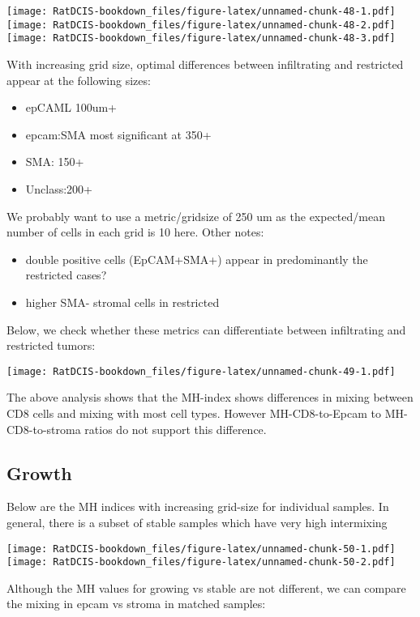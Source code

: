 \documentclass[
]{book}
\providecommand{\tightlist}{%
  \setlength{\itemsep}{0pt}\setlength{\parskip}{0pt}}
\begin{document}
\texttt{[image: RatDCIS-bookdown\_files/figure-latex/unnamed-chunk-48-1.pdf]} \texttt{[image: RatDCIS-bookdown\_files/figure-latex/unnamed-chunk-48-2.pdf]} \texttt{[image: RatDCIS-bookdown\_files/figure-latex/unnamed-chunk-48-3.pdf]}

With increasing grid size, optimal differences between infiltrating and restricted appear at the following sizes:

\begin{itemize}
\tightlist
\item
  epCAML 100um+
\item
  epcam:SMA most significant at 350+
\item
  SMA: 150+
\item
  Unclass:200+
\end{itemize}

We probably want to use a metric/gridsize of 250 um as the expected/mean number of cells in each grid is 10 here.
Other notes:

\begin{itemize}
\tightlist
\item
  double positive cells (EpCAM+SMA+) appear in predominantly the restricted cases?
\item
  higher SMA- stromal cells in restricted
\end{itemize}

Below, we check whether these metrics can differentiate between infiltrating and restricted tumors:

\texttt{[image: RatDCIS-bookdown\_files/figure-latex/unnamed-chunk-49-1.pdf]}

The above analysis shows that the MH-index shows differences in mixing between CD8 cells and mixing with most cell types. However MH-CD8-to-Epcam to MH-CD8-to-stroma ratios do not support this difference.

\hypertarget{growth-2}{%
\subsection{Growth}\label{growth-2}}

Below are the MH indices with increasing grid-size for individual samples. In general, there is a subset of stable samples which have very high intermixing

\texttt{[image: RatDCIS-bookdown\_files/figure-latex/unnamed-chunk-50-1.pdf]} \texttt{[image: RatDCIS-bookdown\_files/figure-latex/unnamed-chunk-50-2.pdf]}

Although the MH values for growing vs stable are not different, we can compare the mixing in epcam vs stroma in matched samples:
\end{document}

